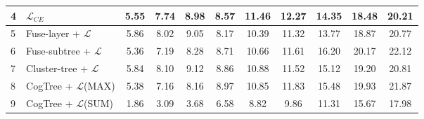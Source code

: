 \documentclass{article}
\begin{document}
\begin{table}[t]
{\begin{tabular}{llccccccccc}
\multicolumn{1}{l|}{4} & \multicolumn{1}{l|}{ $\mathcal{L}_{CE}$}                           & 5.55          & 7.74           & \multicolumn{1}{c|}{8.98}           & 8.57           & 11.46          & \multicolumn{1}{c|}{12.27}          & 14.35         & 18.48          & 20.21         
\\ 
\hline
\multicolumn{1}{l|}{5} & \multicolumn{1}{l|}{Fuse-layer + $\mathcal{L}$} & 5.86  & 8.02 & \multicolumn{1}{c|}{9.05}    & 8.17   & 10.39  & \multicolumn{1}{c|}{11.32}   & 13.77         & 18.87        & 20.77          
\\ 
\multicolumn{1}{l|}{6} & \multicolumn{1}{l|}{Fuse-subtree + $\mathcal{L}$}  & 5.36  & 7.19  & \multicolumn{1}{c|}{8.28}   & 8.71  & 10.66  & \multicolumn{1}{c|}{11.61}   & 16.20         & 20.17        & 22.12         \\
\multicolumn{1}{l|}{7} & \multicolumn{1}{l|}{Cluster-tree + $\mathcal{L}$}  & 5.84  & 8.10 & \multicolumn{1}{c|}{9.12}   & 8.86  & 10.88  & \multicolumn{1}{c|}{11.52}   & 15.12         & 19.20        & 20.81         \\
\hline
\multicolumn{1}{l|}{8} & \multicolumn{1}{l|}{CogTree + $\mathcal{L}$(MAX)}  & 5.38  & 7.16 & \multicolumn{1}{c|}{8.16}   & 8.97  & 10.85  & \multicolumn{1}{c|}{11.83}   & 15.48         & 19.93        & 21.87         \\
\multicolumn{1}{l|}{9} & \multicolumn{1}{l|}{CogTree + $\mathcal{L}$(SUM)}  & 1.86  & 3.09  & \multicolumn{1}{c|}{3.68}   & 6.58  & 8.82  & \multicolumn{1}{c|}{9.86}   & 11.31         & 15.67        & 17.98   \\      
\hline
\end{tabular}}
\label{tab:ablation}
\end{table}
\fi
\end{document}
